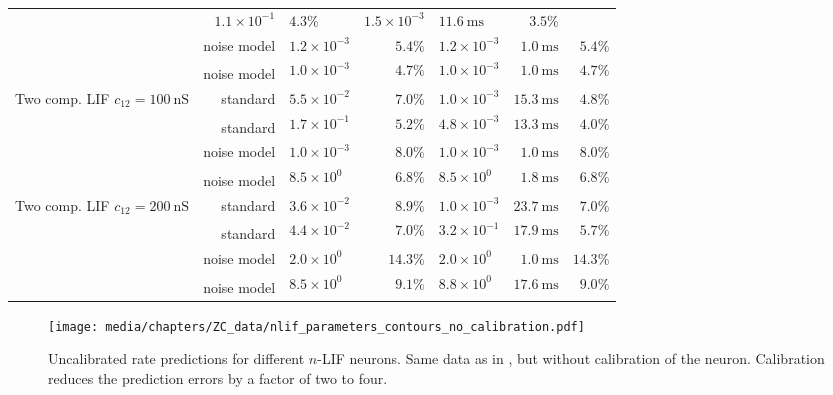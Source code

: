 \begin{table}
\begin{tabular}{r r l r l r r}
			& $1.1 \times 10^{-1}$ & $4.3\%$
			& $1.5 \times 10^{-3}$ & $\SI{11.6}{\milli\second}$ & $3.5\%$ \\
		\cmidrule{2-7}
			& noise model
			& $1.2 \times 10^{-3}$ & $5.4\%$
			& $1.2 \times 10^{-3}$ & $\SI{1.0}{\milli\second}$ & $5.4\%$ \\
			& noise model\textsuperscript{\dag}
			& $1.0 \times 10^{-3}$ & $4.7\%$
			& $1.0 \times 10^{-3}$ & $\SI{1.0}{\milli\second}$ & $4.7\%$ \\
		\midrule
		\multirow{4}{2.7cm}[-0.5em]{\raggedleft Two comp. LIF $c_{12} = \SI{100}{\nano\siemens}$}
			& standard
			& $5.5 \times 10^{-2}$ & $7.0\%$
			& $1.0 \times 10^{-3}$ & $\SI{15.3}{\milli\second}$ & $4.8\%$ \\
			& standard\textsuperscript{\dag}
			& $1.7 \times 10^{-1}$ & $5.2\%$
			& $4.8 \times 10^{-3}$ & $\SI{13.3}{\milli\second}$ & $4.0\%$ \\
		\cmidrule{2-7}
			& noise model
			& $1.0 \times 10^{-3}$ & $8.0\%$
			& $1.0 \times 10^{-3}$ & $\SI{1.0}{\milli\second}$ & $8.0\%$ \\
			& noise model\textsuperscript{\dag}
			& $8.5 \times 10^{0}$ & $6.8\%$
			& $8.5 \times 10^{0}$ & $\SI{1.8}{\milli\second}$ & $6.8\%$ \\
		\midrule
		\multirow{4}{2.7cm}[-0.5em]{\raggedleft Two comp. LIF $c_{12} = \SI{200}{\nano\siemens}$}
			& standard
			& $3.6 \times 10^{-2}$ & $8.9\%$
			& $1.0 \times 10^{-3}$ & $\SI{23.7}{\milli\second}$ & $7.0\%$ \\
			& standard\textsuperscript{\dag}
			& $4.4 \times 10^{-2}$ & $7.0\%$
			& $3.2 \times 10^{-1}$ & $\SI{17.9}{\milli\second}$ & $5.7\%$ \\
		\cmidrule{2-7}
			& noise model
			& $2.0 \times 10^{0}$ & $14.3\%$
			& $2.0 \times 10^{0}$ & $\SI{1.0}{\milli\second}$ & $14.3\%$ \\
			& noise model\textsuperscript{\dag}
			& $8.5 \times 10^{0}$ & $9.1\%$
			& $8.8 \times 10^{0}$ & $\SI{17.6}{\milli\second}$ & $9.0\%$ \\
		\bottomrule
	\end{tabular}
\end{table}



\begin{figure}
	\texttt{[image: media/chapters/ZC\_data/nlif\_parameters\_contours\_no\_calibration.pdf]}
	\caption[Uncalibrated rate predictions for different $n$-LIF neurons]{Uncalibrated rate predictions for different $n$-LIF neurons. Same data as in , but without calibration of the neuron. Calibration reduces the prediction errors by a factor of two to four.}
	\label{fig:nlif_parameters_contours_no_calibration}
\end{figure}

